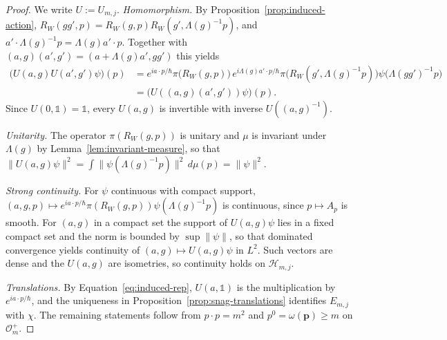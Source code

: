 \begin{proof}
	We write $U:=U_{m,j}$. \emph{Homomorphism.} By Proposition~\ref{prop:induced-action}, $R_W(gg',p)=R_W(g,p)R_W(g',\Lambda(g)^{-1}p)$, and $a'\cdot\Lambda(g)^{-1}p=\Lambda(g)a'\cdot p$. Together with $(a,g)(a',g')=(a+\Lambda(g)a',gg')$ this yields
	\begin{align*}
		\big(U(a,g)U(a',g')\psi\big)(p)&=e^{ia\cdot p/\hbar}\pi\big(R_W(g,p)\big)\,e^{i\Lambda(g)a'\cdot p/\hbar}\pi\big(R_W(g',\Lambda(g)^{-1}p)\big)\psi\big(\Lambda(gg')^{-1}p\big)\\
		&=\big(U((a,g)(a',g'))\psi\big)(p).
	\end{align*}
	Since $U(0,\mathbb{1})=\mathbb{1}$, every $U(a,g)$ is invertible with inverse $U((a,g)^{-1})$.
	
	\emph{Unitarity.} The operator $\pi(R_W(g,p))$ is unitary and $\mu$ is invariant under $\Lambda(g)$ by Lemma~\ref{lem:invariant-measure}, so that $\|U(a,g)\psi\|^2=\int\|\psi(\Lambda(g)^{-1}p)\|^2\,d\mu(p)=\|\psi\|^2$.
	
	\emph{Strong continuity.} For $\psi$ continuous with compact support, $(a,g,p)\mapsto e^{ia\cdot p/\hbar}\pi(R_W(g,p))\psi(\Lambda(g)^{-1}p)$ is continuous, since $p\mapsto A_p$ is smooth. For $(a,g)$ in a compact set the support of $U(a,g)\psi$ lies in a fixed compact set and the norm is bounded by $\sup\|\psi\|$, so that dominated convergence yields continuity of $(a,g)\mapsto U(a,g)\psi$ in $L^2$. Such vectors are dense and the $U(a,g)$ are isometries, so continuity holds on $\mathcal{H}_{m,j}$.
	
	\emph{Translations.} By Equation~\eqref{eq:induced-rep}, $U(a,\mathbb{1})$ is the multiplication by $e^{ia\cdot p/\hbar}$, and the uniqueness in Proposition~\ref{prop:snag-translations} identifies $E_{m,j}$ with $\chi$. The remaining statements follow from $p\cdot p=m^2$ and $p^0=\omega(\mathbf{p})\geq m$ on $\mathcal{O}_m^+$.
\end{proof}

